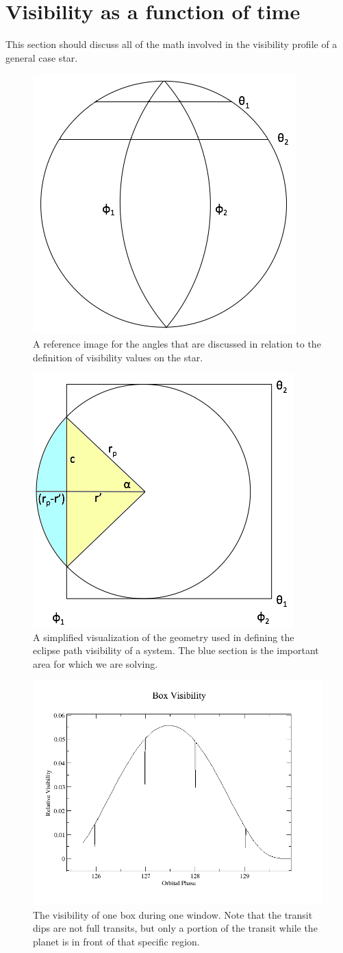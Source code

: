 \documentclass[iop]{emulateapj}
\begin{document}
\section{Visibility as a function of time}
	This section should discuss all of the math involved in the visibility profile of a general case star.
\begin{figure}[h]
	\centering
	\includegraphics[width=.5\textwidth]{images/angles.png}
	\caption{A reference image for the angles that are discussed in relation to the definition of visibility values on the star.}
	\label{angles}
\end{figure}
\begin{figure}[h]
	\centering
	\includegraphics[width=.5\textwidth]{images/figure.png}
	\caption{A simplified visualization of the geometry used in defining the eclipse path visibility of a system. The blue section is the important area for which we are solving.}
	\label{eclipse}
\end{figure}
\begin{figure}[h]
	\centering
	\includegraphics[width=.5\textwidth]{images/box_vis.png}
	\caption{The visibility of one box during one window. Note that the transit dips are not full transits, but only a portion of the transit while the planet is in front of that specific region.}
	\label{box}
\end{figure}
\end{document}
